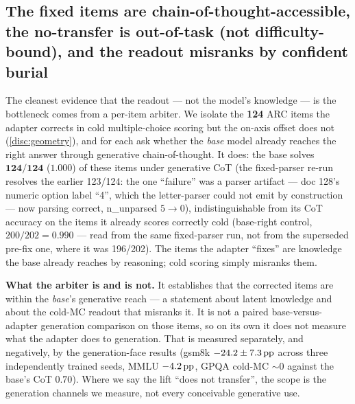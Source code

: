 \subsection{The fixed items are chain-of-thought-accessible, the no-transfer is
out-of-task (not difficulty-bound), and the readout misranks by confident burial}
\label{disc:arbiter}

The cleanest evidence that the readout --- not the model's knowledge --- is the
bottleneck comes from a per-item arbiter. We isolate the \textbf{124} ARC items the
adapter corrects in cold multiple-choice scoring but the on-axis offset does not
(\cref{disc:geometry}), and for each ask whether the \emph{base} model already
reaches the right answer through generative chain-of-thought. It does: the base
solves $\mathbf{124/124}$ ($1.000$) of these items under generative CoT (the
fixed-parser re-run resolves the earlier 123/124: the one ``failure'' was a parser
artifact --- doc 128's numeric option label ``4'', which the letter-parser could not
emit by construction --- now parsing correct, n\_unparsed $5{\rightarrow}0$),
indistinguishable from its CoT accuracy on the items it already scores correctly
cold (base-right control, $200/202 = 0.990$ --- read from the same fixed-parser run,
not from the superseded pre-fix one, where it was 196/202). The items the adapter
``fixes'' are knowledge the base already reaches by reasoning; cold scoring simply
misranks them.

\textbf{What the arbiter is and is not.} It establishes that the corrected items are
within the \emph{base}'s generative reach --- a statement about latent knowledge and
about the cold-MC readout that misranks it. It is not a paired base-versus-adapter
generation comparison on those items, so on its own it does not measure what the
adapter does to generation. That is measured separately, and negatively, by the
generation-face results (gsm8k $-24.2 \pm 7.3\,\mathrm{pp}$ across three independently trained
seeds, MMLU $-4.2\,\mathrm{pp}$, GPQA cold-MC ${\sim}0$ against the base's CoT $0.70$). Where we
say the lift ``does not transfer'', the scope is the generation channels we measure,
not every conceivable generative use.

